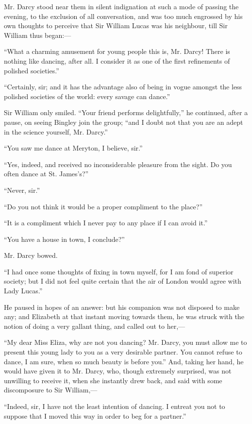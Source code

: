 \documentclass[12pt,openright]{book}
\begin{document}
Mr. Darcy stood near them in silent indignation at such a mode of passing the evening, to the exclusion of all conversation, and was too much engrossed by his own thoughts to perceive that Sir William Lucas was his neighbour, till Sir William thus began:—

“What a charming amusement for young people this is, Mr. Darcy! There is nothing like dancing, after all. I consider it as one of the first refinements of polished societies.”

“Certainly, sir; and it has the advantage also of being in vogue amongst the less polished societies of the world: every savage can dance.”

Sir William only smiled. “Your friend performs delightfully,” he continued, after a pause, on seeing Bingley join the group; “and I doubt not that you are an adept in the science yourself, Mr. Darcy.”

“You saw me dance at Meryton, I believe, sir.”

“Yes, indeed, and received no inconsiderable pleasure from the sight. Do you often dance at St. James’s?”

“Never, sir.”

“Do you not think it would be a proper compliment to the place?”

“It is a compliment which I never pay to any place if I can avoid it.”

“You have a house in town, I conclude?”

Mr. Darcy bowed.

“I had once some thoughts of fixing in town myself, for I am fond of superior society; but I did not feel quite certain that the air of London would agree with Lady Lucas.”

He paused in hopes of an answer: but his companion was not disposed to make any; and Elizabeth at that instant moving towards them, he was struck with the notion of doing a very gallant thing, and called out to her,—

“My dear Miss Eliza, why are not you dancing? Mr. Darcy, you must allow me to present this young lady to you as a very desirable partner. You cannot refuse to dance, I am sure, when so much beauty is before you.” And, taking her hand, he would have given it to Mr. Darcy, who, though extremely surprised, was not unwilling to receive it, when she instantly drew back, and said with some discomposure to Sir William,—

“Indeed, sir, I have not the least intention of dancing. I entreat you not to suppose that I moved this way in order to beg for a partner.”
\end{document}
